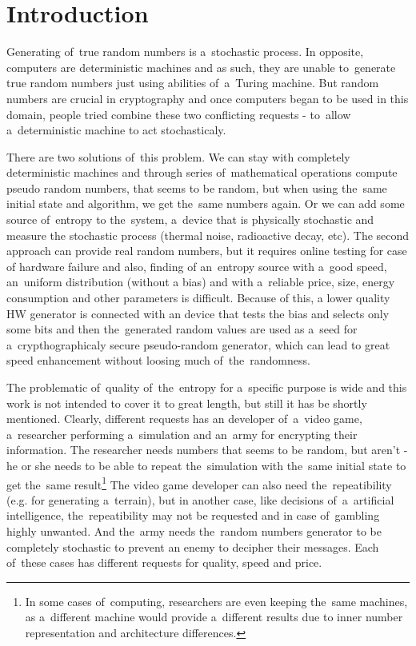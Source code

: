 \chapter{Introduction}
Generating of~true random numbers is a~stochastic process. In opposite, computers are deterministic machines and as such, they are unable to~generate true random numbers just using abilities of~a~Turing machine.  %
But random numbers are crucial in cryptography and once computers began to be used in this domain,  %
people tried combine these two conflicting requests - to~allow a~deterministic machine to act stochasticaly. 

There are two solutions of~this problem. We can stay with completely deterministic machines and through series of~mathematical operations compute pseudo random numbers, that seems to be random, but when using the~same initial state and algorithm, we get the~same numbers again. Or we can add some source of~entropy to the~system, a~device that is physically stochastic and measure the stochastic process (thermal noise, radioactive decay, etc). The second approach can provide real random numbers, but it requires online testing for case of hardware failure and also, finding of an~entropy source with a~good speed, an~uniform distribution (without a bias) and with a~reliable price, size, energy consumption and other parameters is difficult. Because of this, a lower quality HW generator is connected with an device that tests the bias and selects only some bits and then the~generated random values are used as a~seed for a~crypthographicaly secure pseudo-random generator, which can lead to great speed enhancement without loosing much of~the~randomness.

The problematic of~quality of~the~entropy for a~specific purpose is wide and this work is not intended to cover it to great length, but still it has be shortly mentioned. Clearly, different requests has an developer of~a~video game, a~researcher performing a~simulation and an~army for encrypting their information. The researcher needs numbers that seems to be random, but aren't - he or she needs to be able to repeat the~simulation with the~same initial state to get the~same result\footnote{In some cases of~computing, researchers are even keeping the~same machines, as a~different machine would provide a~different results due to inner number representation and architecture differences.\cite{ArithmeticInCloud}%
}
The video game developer can also need the~repeatibility (e.g. for generating a~terrain), but in another case, like decisions of~a~artificial intelligence, the~repeatibility may not be requested and in case of~gambling highly unwanted. And the~army needs the~random numbers generator to be completely stochastic to prevent an enemy to decipher their messages. Each of~these cases has different requests for quality, speed and price.

